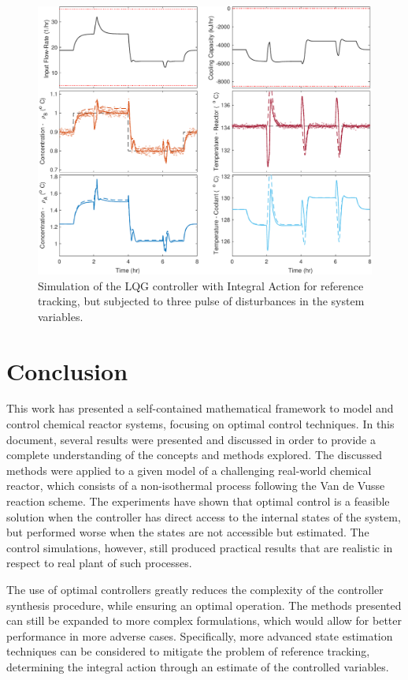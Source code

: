 \documentclass[a4paper,11pt]{book}
\numberwithin{figure}{chapter}
\numberwithin{equation}{chapter}
\numberwithin{table}{chapter}
\theoremstyle{definition}
\begin{document}
\begin{figure}[ht] \centering
	\includegraphics[width=\textwidth]{chapter7/lqgi02}
	\caption{Simulation of the LQG controller with Integral Action for reference tracking, but subjected to three pulse of disturbances in the system variables.}
	\label{fig:lqgi02}
\end{figure}	

\clearpage
\chapter{Conclusion}

This work has presented a self-contained mathematical framework to model and control chemical reactor systems, focusing on optimal control techniques. In this document, several results were presented and discussed in order to provide a complete understanding of the concepts and methods explored. The discussed methods were applied to a given model of a challenging real-world chemical reactor, which consists of a non-isothermal process following the Van de Vusse reaction scheme. The experiments have shown that optimal control is a feasible solution when the controller has direct access to the internal states of the system, but performed worse when the states are not accessible but estimated. The control simulations, however, still produced practical results that are realistic in respect to real plant of such processes.

The use of optimal controllers greatly reduces the complexity of the controller synthesis procedure, while ensuring an optimal operation. The methods presented can still be expanded to more complex formulations, which would allow for better performance in more adverse cases. Specifically, more advanced state estimation techniques can be considered to mitigate the problem of reference tracking, determining the integral action through an estimate of the controlled variables.
\end{document}
